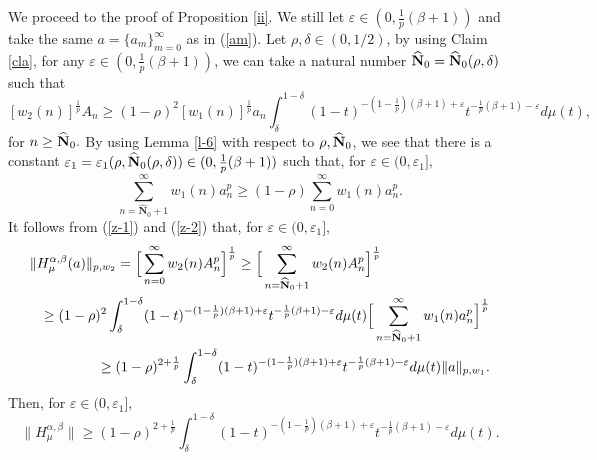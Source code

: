 \documentclass[10pt]{amsart}
\theoremstyle{definition}
\theoremstyle{question}
\numberwithin{equation}{section}
\begin{document}
We proceed to the proof of Proposition \ref{ii}. We still let $\varepsilon\in (0, \frac{1}{p}(\beta+1))$ and take the same $a=\{a_m\}_{m=0}^{\infty}$ as in (\ref{am}). Let $\rho, \delta \in (0,1/2)$, by using Claim \ref{cla}, for any $\varepsilon\in (0, \frac{1}{p}(\beta+1))$, we can take a natural number $\widehat{\bf{N}}_0=\widehat{\bf{N}}_0(\rho, \delta)$ such that 
\begin{equation}\label{z-1}
[w_2(n)]^{\frac{1}{p}}A_n\geq (1-\rho)^2[w_1(n)]^{\frac{1}{p}}a_n\int_{\delta}^{1-\delta}(1-t)^{-(1-\frac{1}{p})(\beta+1)+\varepsilon}t^{-\frac{1}{p}(\beta+1)-\varepsilon}d\mu(t),\end{equation} 
for $n\geq \widehat{\bf{N}}_0.$ By using Lemma \ref{l-6} with respect to $\rho, \widehat{\bf{N}}_0$, we see that there is a constant $\varepsilon_1=\varepsilon_1(\rho, \widehat{\bf{N}}_0(\rho, \delta))\in (0, \frac{1}{p}(\beta+1))$ such that, for $\varepsilon \in (0, \varepsilon_1],$
\begin{equation}\label{z-2}\sum_{n=\widehat{\mathbf{N}}_0+1}^{\infty}w_1(n)a_n^p \geq (1-\rho)\sum_{n=0}^{\infty}w_1(n)a_n^p.\end{equation}
It follows from (\ref{z-1}) and (\ref{z-2}) that, for $\varepsilon \in (0, \varepsilon_1],$
\begin{eqnarray}
\lefteqn{\|H_{\mu}^{\alpha,\beta}(a)\|_{p,w_2}=\Big[\sum_{n=0}^{\infty}w_2(n)A_n^p\Big]^{\frac{1}{p}}\geq \Big[\sum_{n=\widehat{\bf{N}}_0+1}^{\infty}w_2(n)A_n^p\Big]^{\frac{1}{p}}}\nonumber \\
&&\geq  (1-\rho)^{2}\int_{\delta}^{1-\delta}(1-t)^{-(1-\frac{1}{p})(\beta+1)+\varepsilon}t^{-\frac{1}{p}(\beta+1)-\varepsilon}d\mu(t)\Big[\sum_{n=\widehat{\mathbf{N}}_0+1}^{\infty}w_1(n)a_n^p\Big]^{\frac{1}{p}} \nonumber \\
&& \geq (1-\rho)^{2+\frac{1}{p}}\int_{\delta}^{1-\delta}(1-t)^{-(1-\frac{1}{p})(\beta+1)+\varepsilon}t^{-\frac{1}{p}(\beta+1)-\varepsilon}d\mu(t)\|a\|_{p,w_1}. \nonumber 
\end{eqnarray}
Then, for $\varepsilon \in (0, \varepsilon_1],$ \begin{equation}
\|H_{\mu}^{\alpha,\beta}\|\geq (1-\rho)^{2+\frac{1}{p}}\int_{\delta}^{1-\delta}(1-t)^{-(1-\frac{1}{p})(\beta+1)+\varepsilon}t^{-\frac{1}{p}(\beta+1)-\varepsilon}d\mu(t).\nonumber
\end{equation} 
\end{document}
